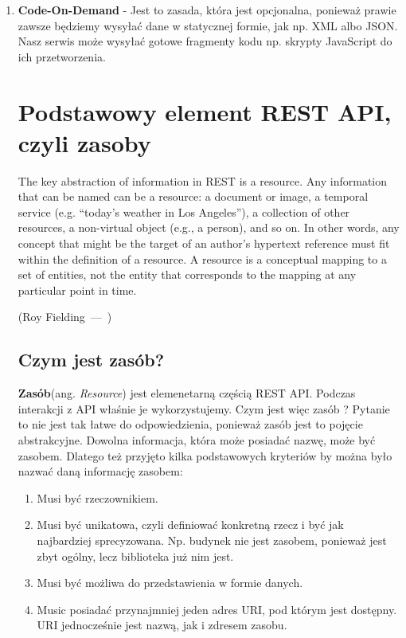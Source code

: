 \documentclass[oneside,polski,logo,indent]{amuthesis}
\let\oldquote\quote
\let\endoldquote\endquote
\renewenvironment{quote}[2][]
  {\if\relax\detokenize{#1}\relax
     \def\quoteauthor{#2}%
   \else
     \def\quoteauthor{#2~---~#1}%
   \fi
   \oldquote}
  {\par\nobreak\smallskip\hfill(\quoteauthor)%
   \endoldquote\addvspace{\bigskipamount}}
\begin{document}
\begin{enumerate}
\begin{enumerate}
\item \textbf{Code-On-Demand} - Jest to zasada, która jest opcjonalna, ponieważ prawie zawsze będziemy wysyłać dane w statycznej formie, jak np. XML albo JSON. Nasz serwis może wysyłać gotowe fragmenty kodu np. skrypty JavaScript do ich przetworzenia. 

\section{Podstawowy element REST API, czyli zasoby}

\begin{quote}{Roy Fielding}
The key abstraction of information in REST is a resource. Any information that can be named can be a resource: a document or image, a temporal service (e.g. “today’s weather in Los Angeles”), a collection of other resources, a non-virtual object (e.g., a person), and so on. In other words, any concept that might be the target of an author’s hypertext reference must fit within the definition of a resource. A resource is a conceptual mapping to a set of entities, not the entity that corresponds to the mapping at any particular point in time.
\end{quote}

\begin{center}
\subsection{Czym jest zasób?}
\end{center}

\textbf{Zasób}(ang. \emph{Resource}) jest elemenetarną częścią REST API. Podczas interakcji z API właśnie je wykorzystujemy. Czym jest więc zasób ? Pytanie to nie jest tak łatwe do odpowiedzienia, ponieważ zasób jest to pojęcie abstrakcyjne. Dowolna informacja, która może posiadać nazwę, może być zasobem. Dlatego też przyjęto kilka podstawowych kryteriów by można było nazwać daną informację zasobem:\newline

\begin{enumerate}
\item Musi być rzeczownikiem.
\item Musi być unikatowa, czyli definiować konkretną rzecz i być jak najbardziej sprecyzowana. Np. budynek nie jest zasobem, ponieważ jest zbyt ogólny, lecz biblioteka już nim jest. 
\item Musi być możliwa do przedstawienia w formie danych.
\item Music posiadać przynajmniej jeden adres URI, pod którym jest dostępny. URI jednocześnie jest nazwą, jak i zdresem zasobu.\newline
\end{enumerate}


\end{enumerate}
\end{enumerate}
\end{document}
